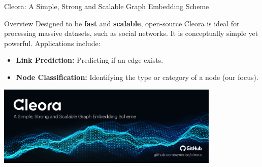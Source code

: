 \begin{frame}{Cleora: A Simple, Strong and Scalable Graph Embedding Scheme}

\begin{block}{Overview}
    Designed to be \textbf{fast} and \textbf{scalable}, open-source Cleora is ideal for processing massive datasets, such as social networks. It is conceptually simple yet powerful. Applications include:
    \begin{itemize}
        \item \textbf{Link Prediction:} Predicting if an edge exists.
        \item \textbf{Node Classification:} Identifying the type or category of a node (our focus).
    \end{itemize}
\end{block}

\vspace{0.5cm}

\begin{center}
    \includegraphics[width=0.8\textwidth]{images/cleora.png}
\end{center}

\end{frame}

